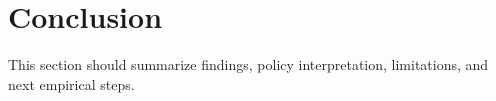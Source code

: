 \section{Conclusion}

This section should summarize findings, policy interpretation, limitations, and next empirical steps.

